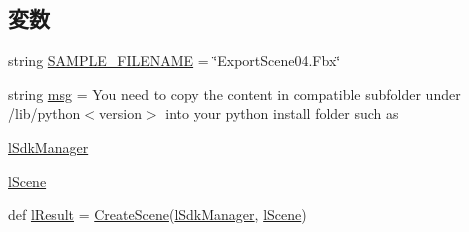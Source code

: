 \subsection*{変数}
\begin{DoxyCompactItemize}
\item 
string \hyperlink{namespace_export_scene04_a9785ea6b2ef4d339df2a2e1073864307}{S\+A\+M\+P\+L\+E\+\_\+\+F\+I\+L\+E\+N\+A\+ME} = \char`\"{}Export\+Scene04.\+Fbx\char`\"{}
\item 
string \hyperlink{namespace_export_scene04_a14ec26d578cac8a7a5d26cb48035ab68}{msg} = \textquotesingle{}You need to copy the content in compatible subfolder under /lib/python$<$version$>$ into your python install folder such as \textquotesingle{}
\item 
\hyperlink{namespace_export_scene04_aeb9bf4e918a5e48b2921706dc613040a}{l\+Sdk\+Manager}
\item 
\hyperlink{namespace_export_scene04_ae1da8ef1dd6abfbcc60d9b6787dba521}{l\+Scene}
\item 
def \hyperlink{namespace_export_scene04_a1de918afdf401b55a9d6348fb55f9870}{l\+Result} = \hyperlink{namespace_export_scene04_a7e8f386cc2dcb6e596b141e4b80eff56}{Create\+Scene}(\hyperlink{namespace_export_scene04_aeb9bf4e918a5e48b2921706dc613040a}{l\+Sdk\+Manager}, \hyperlink{namespace_export_scene04_ae1da8ef1dd6abfbcc60d9b6787dba521}{l\+Scene})
\end{DoxyCompactItemize}


